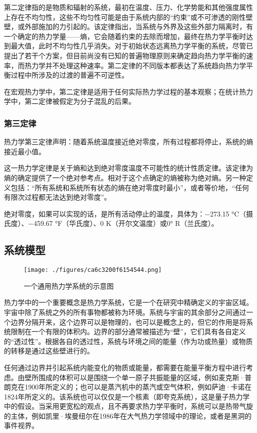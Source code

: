 第二定律指的是物质和辐射的系统，最初在温度、压力、化学势能和其他强度属性上存在不均匀性，这些不均匀性可能是由于系统内部的“约束”或不可渗透的刚性壁壁，或外部施加的力引起的。该定律指出，当系统与外界及这些外部力隔离时，有一个确定的热力学量——熵，它会随着约束的去除而增加，最终在热力学平衡时达到最大值，此时不均匀性几乎消失。对于初始状态远离热力学平衡的系统，尽管已提出了若干个方案，但目前尚没有已知的普遍物理原则来确定趋向热力学平衡的速率，而热力学并不处理这种速率。第二定律的不同版本都表达了系统趋向热力学平衡过程中所涉及的过渡的普遍不可逆性。

在宏观热力学中，第二定律是适用于任何实际热力学过程的基本观察；在统计热力学中，第二定律被假定为分子混乱的后果。
\subsubsection{第三定律}  
热力学第三定律声明：随着系统温度接近绝对零度，所有过程都将停止，系统的熵接近最小值。

这一热力学定律是关于熵和达到绝对零度温度不可能性的统计性质定律。该定律为熵的确定提供了一个绝对参考点。相对于这个点确定的熵被称为绝对熵。另一种定义包括：“所有系统和系统所有状态的熵在绝对零度时最小”，或者等价地，“任何有限次过程都无法达到绝对零度”。

绝对零度，如果可以实现的话，是所有活动停止的温度，具体为：−273.15 °C（摄氏度）、−459.67 °F（华氏度）、0 K（开尔文温度）或0° R（兰氏度）。
\subsection{系统模型}
\begin{figure}[ht]
\centering
\texttt{[image: ./figures/ca6c3200f6154544.png]}
\caption{一个通用热力学系统的示意图} \label{fig_RLX_4}
\end{figure}
热力学中的一个重要概念是热力学系统，它是一个在研究中精确定义的宇宙区域。宇宙中除了系统之外的所有事物都被称为环境。系统与宇宙的其余部分之间通过一个边界分隔开来，这个边界可以是物理的，也可以是概念上的，但它的作用是将系统限制在一个有限的体积内。边界的部分通常被描述为“壁”，它们具有各自定义的“透过性”。根据各自的透过性，系统与环境之间的能量（作为功或热量）或物质的转移是通过这些壁进行的。

任何通过边界并引起系统内能变化的物质或能量，都需要在能量平衡方程中进行考虑。由壁所围成的体积可以是围绕一个单一原子共振能量的区域，例如麦克斯·普朗克在1900年所定义的；也可以是蒸汽机中的蒸汽或空气体积，例如萨迪·卡诺在1824年所定义的。该系统也可以仅仅是一个核素（即夸克系统），这是量子热力学中的假设。当采用更宽松的观点，且不再要求热力学平衡时，系统可以是热带气旋的主体，例如凯里·埃曼纽尔在1986年在大气热力学领域中的理论，或者是黑洞的事件视界。

